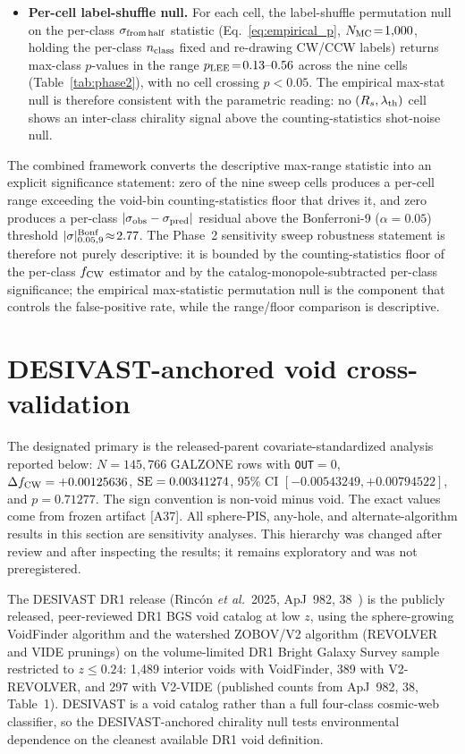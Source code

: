\documentclass[aps,prd,twocolumn,superscriptaddress,showpacs,preprintnumbers,nofootinbib,longbibliography,floatfix]{revtex4-2}
\begin{document}
\begin{itemize}
\item \textbf{Per-cell label-shuffle null.} For each cell, the
label-shuffle permutation null on the per-class $\sigma_{\rm from\,half}$
statistic (Eq.~\eqref{eq:empirical_p}, $N_{\rm MC}\!=\!1{,}000$,
holding the per-class $n_{\rm class}$ fixed and re-drawing CW/CCW
labels) returns max-class $p$-values in the range $p_{\rm LEE}\!=\!
0.13\text{--}0.56$ across the nine cells (Table~\ref{tab:phase2}),
with no cell crossing
$p\!<\!0.05$. The empirical max-stat null is therefore consistent
with the parametric reading: no $(R_s, \lambda_{\rm th})$ cell shows
an inter-class chirality signal above the counting-statistics
shot-noise null.
\end{itemize}

The combined framework converts the descriptive max-range statistic
into an explicit significance statement: zero of the nine sweep
cells produces a per-cell range exceeding the void-bin
counting-statistics floor that drives it, and zero produces a per-class
$|\sigma_{\rm obs}-\sigma_{\rm pred}|$ residual above the Bonferroni-9
($\alpha
= 0.05$) threshold $|\sigma|^{\rm Bonf}_{0.05,9}\!\approx\!2.77$. The
Phase~2 sensitivity sweep robustness statement is therefore not
purely descriptive: it is bounded by the counting-statistics floor
of the per-class $f_{\rm CW}$ estimator and by the
catalog-monopole-subtracted per-class significance; the empirical
max-statistic permutation null is the component that controls the
false-positive rate, while the range/floor comparison is descriptive.

\section{DESIVAST-anchored void cross-validation}\label{sec:desivast_primary}

The designated primary is the released-parent covariate-standardized
analysis reported below: $N=145{,}766$ GALZONE rows with
\texttt{OUT}$=0$, $\Delta f_{\rm CW}=+0.00125636$,
${\rm SE}=0.00341274$, 95\% CI
$[-0.00543249,+0.00794522]$, and $p=0.71277$. The sign convention is
non-void minus void. The exact values come from frozen artifact [A37].
All sphere-PIS, any-hole, and alternate-algorithm results in this
section are sensitivity analyses. This hierarchy was changed after
review and after inspecting the results; it remains exploratory and
was not preregistered.

The DESIVAST DR1 release (Rinc\'on \textit{et al.}\ 2025, ApJ~982,
38~\cite{DESIVAST2025}) is the publicly released, peer-reviewed
DR1 BGS void catalog at low $z$, using the sphere-growing VoidFinder
algorithm and the watershed ZOBOV/V2 algorithm (REVOLVER and VIDE
prunings) on the volume-limited DR1 Bright Galaxy Survey sample
restricted to $z \leq 0.24$: 1,489 interior voids with VoidFinder,
389 with V2-REVOLVER, and 297 with V2-VIDE (published counts
from ApJ~982, 38, Table~1). DESIVAST is a void
catalog rather than a full four-class cosmic-web classifier, so the
DESIVAST-anchored chirality null tests environmental dependence on
the cleanest available DR1 void definition.
\end{document}
